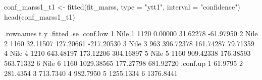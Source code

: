 \begin{Schunk}
\begin{Sinput}
 conf_marss1_t1 <- fitted(fit_marss, type = "ytt1", interval = "confidence")
 head(conf_marss1_t1)
\end{Sinput}
\begin{Soutput}
  .rownames t    y    .fitted       .se  .conf.low
1      Nile 1 1120    0.00000  31.62278  -61.97950
2      Nile 2 1160   32.11507 127.20661 -217.20530
3      Nile 3  963  396.72378 161.74287   79.71359
4      Nile 4 1210  643.48197 173.12206  304.16897
5      Nile 5 1160  909.42338 176.38593  563.71332
6      Nile 6 1160 1029.38565 177.27798  681.92720
   .conf.up
1   61.9795
2  281.4354
3  713.7340
4  982.7950
5 1255.1334
6 1376.8441
\end{Soutput}
\end{Schunk}
